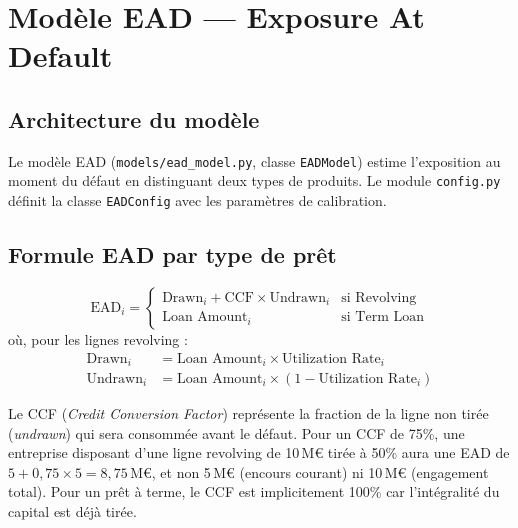 \documentclass[12pt,a4paper]{article}
\begin{document}
\section{Mod\`ele EAD --- Exposure At Default}
\label{sec:ead}

\subsection{Architecture du mod\`ele}

Le mod\`ele EAD (\texttt{models/ead\_model.py}, classe \texttt{EADModel}) estime l'exposition au moment du d\'efaut en distinguant deux types de produits. Le module \texttt{config.py} d\'efinit la classe \texttt{EADConfig} avec les param\`etres de calibration.

\subsection{Formule EAD par type de pr\^et}

\begin{formulebox}
\begin{equation}
\label{eq:ead}
\text{EAD}_i = \begin{cases}
\text{Drawn}_i + \text{CCF} \times \text{Undrawn}_i & \text{si Revolving} \\[4pt]
\text{Loan Amount}_i & \text{si Term Loan}
\end{cases}
\end{equation}
o\`u, pour les lignes revolving :
\begin{align}
\text{Drawn}_i &= \text{Loan Amount}_i \times \text{Utilization Rate}_i \\
\text{Undrawn}_i &= \text{Loan Amount}_i \times (1 - \text{Utilization Rate}_i)
\end{align}
\end{formulebox}

\begin{interpretbox}
Le CCF (\textit{Credit Conversion Factor}) repr\'esente la fraction de la ligne non tir\'ee (\textit{undrawn}) qui sera consomm\'ee avant le d\'efaut. Pour un CCF de 75\%, une entreprise disposant d'une ligne revolving de 10\,M\euro{} tir\'ee \`a 50\% aura une EAD de $5 + 0{,}75 \times 5 = 8{,}75$\,M\euro{}, et non 5\,M\euro{} (encours courant) ni 10\,M\euro{} (engagement total). Pour un pr\^et \`a terme, le CCF est implicitement 100\% car l'int\'egralit\'e du capital est d\'ej\`a tir\'ee.
\end{interpretbox}
\end{document}

